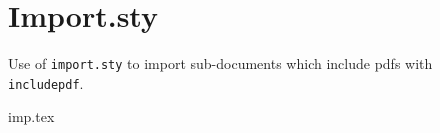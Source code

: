 \documentclass[a4paper]{article}
\begin{document}
\section{Import.sty}
Use of \texttt{import.sty} to import sub-documents which include
pdfs with \texttt{includepdf}.


\begingroup
{imp.tex}
\endgroup
\end{document}
